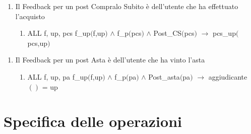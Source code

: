 \documentclass{article}
\begin{document}
\begin{enumerate}
    \item Il Feedback per un post Compralo Subito è dell'utente che ha effettuato l'acquisto
    \begin{enumerate}
        \item ALL f, up, pcs f\_up$($f,up$)$ $\land$ f\_p$($pcs$)$ $\land$ Post\_CS$($pcs$)$ $\rightarrow$ pcs\_up$($pcs,up$)$
    \end{enumerate}
\end{enumerate}

\begin{enumerate}
    \item Il Feedback per un post Asta è dell'utente che ha vinto l'asta
    \begin{enumerate}
        \item ALL f, up, pa f\_up$($f,up$)$ $\land$ f\_p$($pa$)$ $\land$ Post\_asta$($pa$)$ $\rightarrow$ aggiudicante$()$ = up
    \end{enumerate}
\end{enumerate}

\newpage
\section{\label{sec:SpecificaOperazioni}Specifica delle operazioni}
\end{document}
